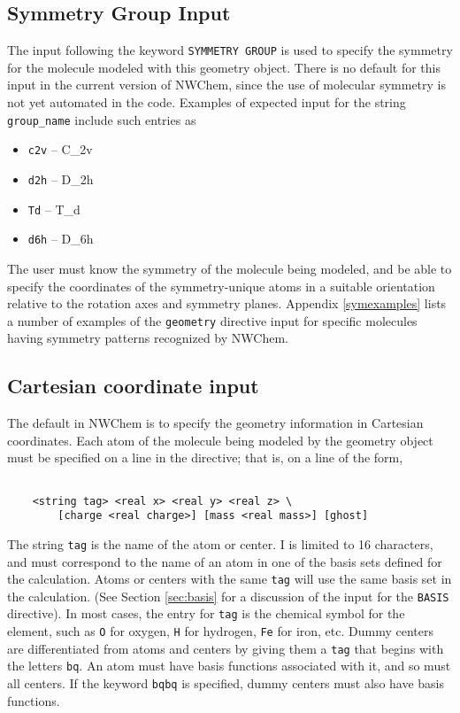\subsection{Symmetry Group Input}

The input following the keyword \verb+SYMMETRY GROUP+ is used to specify
the symmetry for the molecule modeled with this geometry object.
There is no default for this input in the current version of NWChem, since
the use of molecular symmetry is not yet automated in the code.
Examples of expected input for the string \verb+group_name+ include
such entries as

\begin{itemize}
\item \verb+c2v+ -- C\_{2v}
\item \verb+d2h+ -- D\_{2h}
\item \verb+Td+ -- T\_{d}
\item \verb+d6h+ -- D\_{6h}
\end{itemize}

The user must know the symmetry of the molecule being modeled, and be able
to specify the
coordinates of the symmetry-unique atoms in a suitable orientation
relative to the rotation axes and symmetry planes.  
Appendix \ref{symexamples} lists a number of examples of the \verb+geometry+
directive input for specific molecules having symmetry patterns recognized
by NWChem.

\subsection{Cartesian coordinate input}
\label{sec:cart}

The default in NWChem is to specify the geometry information in Cartesian 
coordinates.  Each atom of the molecule being modeled by the geometry
object must be specified on a line in the directive; that is, on a line of
the form,

\begin{verbatim}

    <string tag> <real x> <real y> <real z> \
        [charge <real charge>] [mass <real mass>] [ghost]

\end{verbatim}

The string \verb+tag+ is the name of the atom or center.  I is limited to
16 characters, and must correspond to the
name of an atom in one of the basis sets defined for the calculation.
Atoms or centers with the same \verb+tag+ will use the same basis set in
the calculation. 
(See Section \ref{sec:basis} for a discussion of the input for the
\verb+BASIS+ directive).  In most cases, the entry for \verb+tag+ is the
chemical symbol for the element, such as \verb+O+ for oxygen, \verb+H+
for hydrogen, \verb+Fe+ for iron, etc.  Dummy centers 
are differentiated from atoms and centers by giving them a \verb+tag+ that 
begins with the letters \verb+bq+.  An atom must have basis functions
associated with it, and so must all centers.  If the keyword \verb+bqbq+
is specified, dummy centers must also have basis functions.


